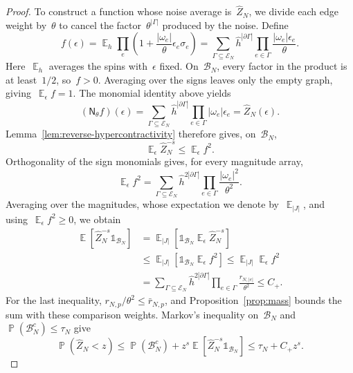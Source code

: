 \documentclass[letterpaper,11pt,reqno]{amsart}
\renewcommand{\leq}{\leqslant}
\renewcommand{\geq}{\geqslant}
\newcommand{\ind}{\mathds{1}}
\DeclareMathOperator{\E}{\mathds{E}}
\DeclareMathOperator{\pr}{\mathds{P}}
\newcommand{\hh}{\hat{h}}
\begin{document}
\begin{proof}
To construct a function whose noise average is~$\widehat Z_N$, we divide each edge weight by~$\theta$ to cancel the factor~$\theta^{|\Gamma|}$ produced by the noise. Define
\begin{equation}\label{eq:inflated-sign-function}
f(\epsilon)=\E_h\prod_e\left(1+\frac{|\omega_e|}{\theta}\epsilon_e\sigma_e\right)
=\sum_{\Gamma\subseteq\mathcal E_N}\hh^{|\partial\Gamma|}
\prod_{e\in\Gamma}\frac{|\omega_e|\epsilon_e}{\theta}.
\end{equation}
Here~$\E_h$ averages the spins with~$\epsilon$ fixed. On~$\mathcal B_N$, every factor in the product is at least~$1/2$, so~$f>0$. Averaging over the signs leaves only the empty graph, giving~$\E_\epsilon f=1$. The monomial identity above yields
\begin{equation*}
(\mathsf N_\theta f)(\epsilon)
=\sum_{\Gamma\subseteq\mathcal E_N}\hh^{|\partial\Gamma|}
\prod_{e\in\Gamma}|\omega_e|\epsilon_e
=\widehat Z_N(\epsilon).
\end{equation*}
Lemma~\ref{lem:reverse-hypercontractivity} therefore gives, on~$\mathcal B_N$,
\begin{equation*}
\E_\epsilon\widehat Z_N^{-s}\leq\E_\epsilon f^2.
\end{equation*}
Orthogonality of the sign monomials gives, for every magnitude array,
\begin{equation}\label{eq:conditional-second-moment}
\E_\epsilon f^2=\sum_{\Gamma\subseteq\mathcal E_N}
\hh^{2|\partial\Gamma|}\prod_{e\in\Gamma}\frac{|\omega_e|^2}{\theta^2}.
\end{equation}
Averaging over the magnitudes, whose expectation we denote by~$\E_{|J|}$, and using~$\E_\epsilon f^2\geq0$, we obtain
\begin{align*}
\E[\widehat Z_N^{-s}\ind_{\mathcal B_N}]
&=\E_{|J|}\!\left[\ind_{\mathcal B_N}\E_\epsilon\widehat Z_N^{-s}\right]\\
&\leq\E_{|J|}[\ind_{\mathcal B_N}\E_\epsilon f^2]
\leq\E_{|J|}\E_\epsilon f^2\\
&=\sum_{\Gamma\subseteq\mathcal E_N}\hh^{2|\partial\Gamma|}
\prod_{e\in\Gamma}\frac{r_{N,|e|}}{\theta^2}
\leq C_+.
\end{align*}
For the last inequality, $r_{N,p}/\theta^2\leq\bar r_{N,p}$, and Proposition~\ref{prop:mass} bounds the sum with these comparison weights. Markov's inequality on~$\mathcal B_N$ and~$\pr(\mathcal B_N^c)\leq\tau_N$ give
\begin{equation*}
\pr(\widehat Z_N<z)
\leq\pr(\mathcal B_N^c)+z^s\E[\widehat Z_N^{-s}\ind_{\mathcal B_N}]
\leq\tau_N+C_+z^s.
\end{equation*}
\end{proof}
\end{document}
